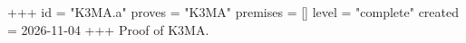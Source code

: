 +++
id = "K3MA.a"
proves = "K3MA"
premises = []
level = "complete"
created = 2026-11-04
+++
Proof of K3MA.
